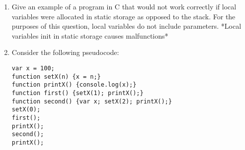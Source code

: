 \documentclass{article}
\begin{document}
\begin{enumerate}
\begin{enumerate}
\begin{verbatim}
    (function() {
      alert("Goodbye")
    }())
    \end{verbatim} \\
    This case is ambiguous because it seems as though \texttt{sayHello()} is a declaration, and the second function looks like it is being called. But, since there is no semicolon to break the first function definition, the parentheses around the second function act as a function call. It does not pass a value; instead, it calls a \texttt{void} function, which prints \texttt{"Goodbye"}. The script will print \texttt{"Goodbye"} first, and then \texttt{"Hello"}. Python does not run into this problem, because a function call has to be on the same line. The \texttt{NEWLINE} character will prevent anything that looks like a potential function call written on separate lines.
\end{enumerate}
\pagebreak
\item Give an example of a program in C that would not work correctly if local variables were allocated in static storage as opposed to the stack. For the purposes of this question, local variables do not include parameters. *Local variables init in static storage causes malfunctions*\\

\pagebreak
\item Consider the following pseudocode:
\begin{verbatim}
var x = 100;
function setX(n) {x = n;}
function printX() {console.log(x);}
function first() {setX(1); printX();}
function second() {var x; setX(2); printX();}
setX(0);
first();
printX();
second();
printX();
\end{verbatim}


\end{enumerate}
\end{document}
